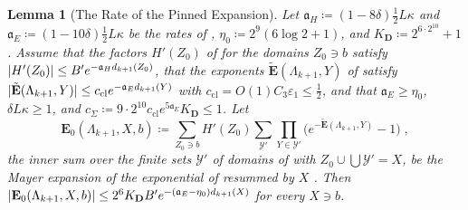 \documentclass[11pt]{preprint}
\DeclarePairedDelimiter{\abs}{\lvert}{\rvert}
\numberwithin{equation}{section}
\newtheorem{lemma}{Lemma}[section]
\theoremstyle{definition}
\theoremstyle{remark}
\theoremstyle{plain}
\begin{document}
\begin{lemma}[The Rate of the Pinned Expansion]\label{lem:pinned-rate}
Let $\mathfrak a_H \coloneqq (1 - 8\delta)\frac12L\kappa$ and $\mathfrak a_E \coloneqq (1 - 10\delta)\frac12L\kappa$ be the rates of \cite[(2.38), (2.41)]{BalabanRG2}, $\eta_0 \coloneqq 2^9(6\log2 + 1)$, and $K_{\mathbf D} \coloneqq 2^{6\cdot2^{10}} + 1$. Assume that the factors $H'(Z_0)$ of \cite[(3.44)]{BalabanCRE} for the domains $Z_0 \ni b$ satisfy $\abs{H'(Z_0)} \leq B'e^{-\mathfrak a_Hd_{k+1}(Z_0)}$, that the exponents $\tilde{\mathbf E}(\Lambda_{k+1}, Y)$ of \cite[(3.46)]{BalabanCRE} satisfy $\abs{\tilde{\mathbf E}(\Lambda_{k+1}, Y)} \leq c_{\mathrm{cl}}e^{-\mathfrak a_Ed_{k+1}(Y)}$ with $c_{\mathrm{cl}} = O(1)C_3\varepsilon_1 \leq \frac12$, and that $\mathfrak a_E \geq \eta_0$, $\delta L\kappa \geq 1$, and $c_\Sigma \coloneqq 9 \cdot 2^{10}c_{\mathrm{cl}}e^{5\mathfrak a_E}K_{\mathbf D} \leq 1$. Let
\begin{equation}\label{eq:pinned-term}
    \mathbf E_0(\Lambda_{k+1}, X, b) \coloneqq \sum_{Z_0 \ni b}H'(Z_0)\sum_{\mathcal Y'}\prod_{Y \in \mathcal Y'}\bigl(e^{-\tilde{\mathbf E}(\Lambda_{k+1}, Y)} - 1\bigr)\;,
\end{equation}
the inner sum over the finite sets $\mathcal Y'$ of domains of \cite[(3.46)]{BalabanCRE} with $Z_0 \cup \bigcup\mathcal Y' = X$, be the Mayer expansion of the exponential of \cite[(3.46)]{BalabanCRE} resummed by $X$ \cite[p.~278, ll.~13--15]{BalabanCRE}. Then $\abs{\mathbf E_0(\Lambda_{k+1}, X, b)} \leq 2^6K_{\mathbf D}B'e^{-(\mathfrak a_E - \eta_0)d_{k+1}(X)}$ for every $X \ni b$.
\end{lemma}
\end{document}

